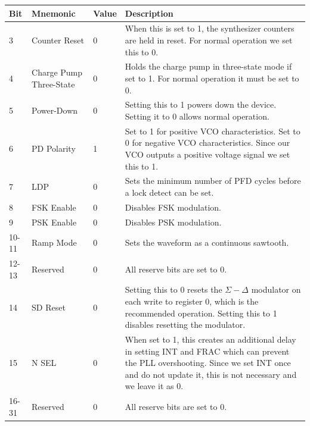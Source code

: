 \label{tab:adf4158-reg-map-3}
\begin{tabularx}{\textwidth}{l l l X}
        \caption{FUNCTION REGISTER(R3) MAP} \\
        \toprule
        Bit & Mnemonic & Value & Description \\
        \midrule

        3 & Counter Reset & 0 & When this is set to 1, the synthesizer counters are held in reset. For
        normal operation we set this to 0. \\
        4 & Charge Pump Three-State & 0 & Holds the charge pump in three-state mode if set to 1. For
        normal operation it must be set to 0. \\
        5 & Power-Down & 0 & Setting this to 1 powers down the device. Setting it to 0 allows normal
        operation. \\
        6 & PD Polarity & 1 & Set to 1 for positive VCO characteristics. Set to 0 for negative VCO
        characteristics. Since our VCO outputs a positive voltage signal we set this
        to 1. \\
        7 & LDP & 0 & Sets the minimum number of PFD cycles before a lock detect can be set. \\
        8 & FSK Enable & 0 & Disables FSK modulation. \\
        9 & PSK Enable & 0 & Disables PSK modulation. \\
        10-11 & Ramp Mode & 0 & Sets the waveform as a continuous sawtooth. \\
        12-13 & Reserved & 0 & All reserve bits are set to 0. \\
        14 & SD Reset & 0 & Setting this to 0 resets the $\Sigma-\Delta$ modulator on each write to
        register 0, which is the recommended operation. Setting this to 1 disables
        resetting the modulator. \\
        15 & N SEL & 0 & When set to 1, this creates an additional delay in setting INT and FRAC which can
        prevent the PLL overshooting. Since we set INT once and do not update it, this is
        not necessary and we leave it as 0. \\
        16-31 & Reserved & 0 & All reserve bits are set to 0. \\

        \bottomrule
\end{tabularx}


